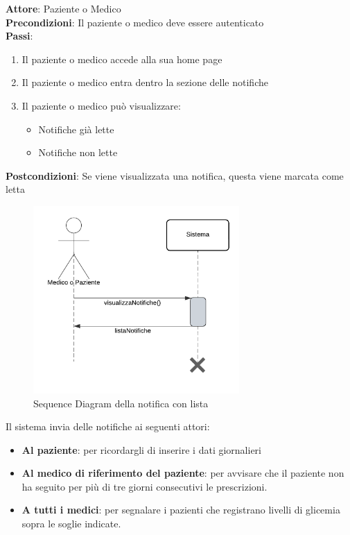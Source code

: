 \documentclass[a4paper]{article}
\begin{document}
\begin{mdframed}
	\textbf{Attore}: Paziente o Medico\\
	\textbf{Precondizioni}: Il paziente o medico deve essere autenticato\\
	\textbf{Passi}: 
	\begin{enumerate}[nosep]
	  \item Il paziente o medico accede alla sua home page
	  \item Il paziente o medico entra dentro la sezione delle notifiche
	  \item  Il paziente o medico può visualizzare:
	  \begin{itemize}
		  \item  Notifiche già lette
		  \item  Notifiche non lette
	  \end{itemize}
	\end{enumerate}
	\textbf{Postcondizioni}: Se viene visualizzata una notifica, questa viene marcata come letta
  \end{mdframed}


\begin{figure}[H]
	\centering
	\includegraphics[width=0.7\textwidth]{sdNotifList.pdf}
	\caption{Sequence Diagram della notifica con lista}
	\label{fig:sdNotifList}
\end{figure}
\noindent
Il sistema invia delle notifiche ai seguenti attori:
\begin{itemize}
	\item \textbf{Al paziente}: per ricordargli di inserire i dati giornalieri
	\item \textbf{Al medico di riferimento del paziente}: per avvisare che il paziente  
	non ha seguito per più di tre giorni consecutivi le prescrizioni.
	\item \textbf{A tutti i medici}: per segnalare i pazienti che registrano
	livelli di glicemia sopra le soglie indicate.
\end{itemize}
\end{document}
